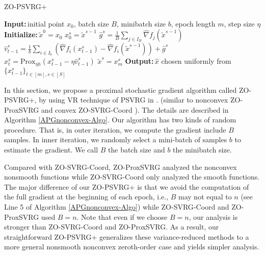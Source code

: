 \documentclass{article}
\newcommand*{\Po}{\text{Prox}}
\newcommand{\Initialize}{\textbf{Initialize:}{\,}}
\newcommand{\Input}{\textbf{Input:}{\,}}
\newcommand{\Output}{\textbf{Output:}{\,}}
\theoremstyle{definition}
\theoremstyle{remark}
\begin{document}
\begin{algorithm}\label{APGnonconvex-Algo}
\caption{ZO-PSVRG+}
\begin{algorithmic}[1]
\State\Input initial point $x_0$, batch size $B$, minibatch size $b$, epoch length $m$, step size $\eta$
\State\Initialize $\tilde{x}^0 = x_0$
\State $x_0^s = \widetilde{x}^{s-1}$
\State $\hat{g}^s = \frac{1}{B} \sum_{j\in I_B} \hat{\nabla} f_j (\widetilde{x}^{s-1})$
\State ${\hat{v}}_{t-1}^s = \frac{1}{b} \sum_{i\in I_b}\left(\hat{\nabla} f_{i}(x_{t-1}^s)-\hat{\nabla} f_{i}(\tilde{x}^{s-1})\right)+\hat{g}^s$
\State $x_{t}^s= \Po_{\eta h}(x_{t-1}^s - \eta \hat{v}_{t-1}^s)$
\EndFor
\State $\widetilde{x}^{s} = x_m^s$
 \EndFor
 \State\Output $\hat{x}$ chosen uniformly from $\{x_{t-1}^s\}_{t\in [m], s\in [S]}$
\end{algorithmic}
\end{algorithm}
{\color{Violet}
In this section, we propose a proximal stochastic gradient algorithm called ZO-PSVRG+, by using VR technique of PSVRG in \cite{xiao2014proximal,reddi2016proximal,li2018simple}.
(similar to nonconvex ZO-ProxSVRG \cite{} and convex ZO-SVRG-Coord \cite{}). The details
are described in Algorithm \ref{APGnonconvex-Algo}.
{\color{Brown}
Our algorithm has two kinds of random procedure. That is, in outer iteration,
we compute the gradient include $B$ samples. In inner iteration, we randomly select a mini-batch of samples $b$ to estimate the gradient.}
 We call $B$ the batch size and $b$ the minibatch size.

Compared with ZO-SVRG-Coord, ZO-ProxSVRG analyzed the nonconvex nonsmooth functions while ZO-SVRG-Coord only analyzed the smooth functions. The major difference of our ZO-PSVRG+ is that
we avoid the computation of the full gradient at the beginning of each epoch, i.e., $B$ may not equal to $n$ (see Line 5 of Algorithm \ref{APGnonconvex-Algo}) while ZO-SVRG-Coord and ZO-ProxSVRG used $B = n$. Note that even if we choose $B = n$, our analysis is
stronger than ZO-SVRG-Coord and ZO-ProxSVRG. As a result, our straightforward ZO-PSVRG+ generalizes these variance-reduced methods to a more general nonsmooth nonconvex zeroth-order case and yields simpler analysis.
}
\end{document}
